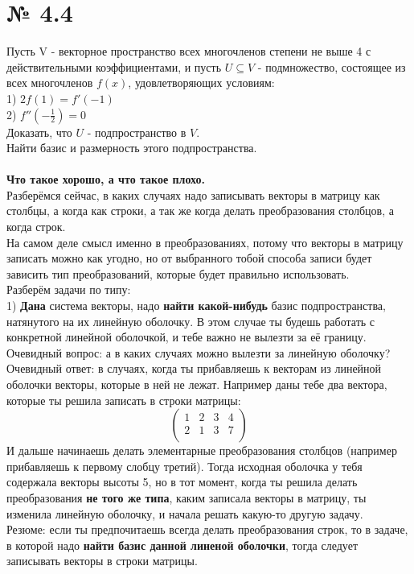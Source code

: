\documentclass[a4paper,11pt]{report}
\begin{document}
\section{№ 4.4}
Пусть V - векторное пространство всех многочленов степени не выше 4 с действительными коэффициентами, и пусть
$U \subseteq V$ - подмножество, состоящее из всех многочленов $f(x)$, удовлетворяющих условиям:\\
1) $2f(1) = f'(-1)$\\
2) $f''(-\frac{1}{2}) = 0$\\
Доказать, что $U$ - подпространство в $V$.\\
Найти базис и размерность этого подпространства.
\\
\\
\textbf{Что такое хорошо, а что такое плохо.}\\
Разберёмся сейчас, в каких случаях надо записывать векторы в матрицу как столбцы, а когда как строки, а так же
когда делать преобразования столбцов, а когда строк.\\
На самом деле смысл именно в преобразованиях, потому что векторы в матрицу записать можно как угодно, но
от выбранного тобой способа записи будет зависить тип преобразований, которые будет правильно использовать.\\
Разберём задачи по типу:\\
1) \textbf{Дана} система векторы, надо \textbf{найти какой-нибудь} базис подпространства, натянутого на их
линейную оболочку. В этом случае ты будешь работать с конкретной линейной оболочкой, и тебе важно не 
вылезти за её границу. Очевидный вопрос: а в каких случаях можно вылезти за линейную оболочку? 
Очевидный ответ: в случаях, когда ты прибавляешь к векторам из линейной оболочки векторы,
которые в ней не лежат. Например даны тебе два вектора, которые ты решила записать в строки матрицы:
\[
\begin{pmatrix}
1 & 2 & 3 & 4\\
2 & 1 & 3 & 7\\
\end{pmatrix}
\]
И дальше начинаешь делать элементарные преобразования столбцов (например прибавляешь к первому слобцу третий).
Тогда исходная оболочка у тебя содержала векторы высоты 5, но в тот момент, когда ты решила делать преобразования
\textbf{не того же типа}, каким записала векторы в матрицу, ты изменила линейную оболочку, и начала решать какую-то другую
задачу.\\
Резюме: если ты предпочитаешь всегда делать преобразования строк, то в задаче, в которой надо \textbf{найти базис данной линеной 
оболочки}, тогда следует записывать векторы в строки матрицы.\\
\end{document}

